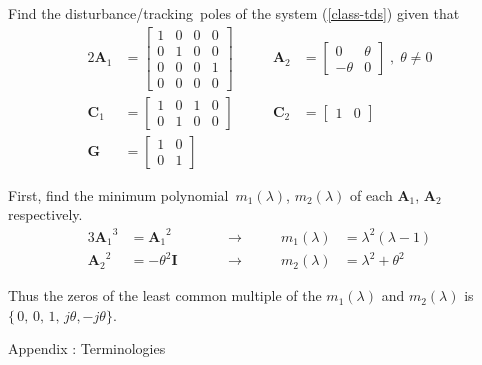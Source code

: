 \documentclass[a4paper,11pt]{article} %
\theoremstyle{plain} %
{\theorembodyfont{\normalfont}
\newtheorem{Exa}{Example}}
\def\mp{minimum polynomial}
\def\dt{disturbance/tracking}
\newcommand{\matr}[1]{\mathbf{#1}}
\begin{document}
\begin{Exa} Find the \dt\ poles of the system (\ref{class-tds}) given that
\begin{alignat}{2}
\matr{A}_1 &= \left[ \begin{array}{cccc}
         1 & 0 & 0 & 0 \\
         0 & 1 & 0 & 0 \\
         0 & 0 & 0 & 1 \\
         0 & 0 & 0 & 0
      \end{array} \right]      &\qquad %
\matr{A}_2 &= \left[ \begin{array}{rr}
         0 & \theta \\
         -\theta & 0
      \end{array} \right] \; , \; \theta \neq 0      \nonumber \\%
\matr{C}_1 &= \left[ \begin{array}{cccc}
         1 & 0 & 1 & 0 \\
         0 & 1 & 0 & 0
       \end{array} \right]   &\qquad
\matr{C}_2 &= \left[ \begin{array}{cc}
                1 & 0
       \end{array} \right]     \nonumber \\%
\matr{G} &= \left[ \begin{array}{cc}
          1 & 0 \\
          0 & 1
     \end{array} \right] \nonumber
\end{alignat}

First, find the \mp\ $m_1(\lambda)$, $m_2(\lambda)$ of each $\matr{A}_1$, $\matr{A}_2$ respectively.
\begin{alignat}{3}
{\matr{A}_1}^3 &= {\matr{A}_1}^2 &\qquad  &\rightarrow &\qquad m_1(\lambda) &= {\lambda}^2 (\lambda - 1) \nonumber \\%
{\matr{A}_2}^2 &= -{\theta}^2 \matr{I} &\qquad &\rightarrow  &\qquad
m_2(\lambda) &= {\lambda}^2+{\theta}^2 \nonumber
\end{alignat}

Thus the zeros of the least common multiple of the $m_1(\lambda)$
and $m_2(\lambda)$ is $\{\,0,\,0,\,1,\,j \theta, -j \theta \}$.

\end{Exa}

\vspace{\baselineskip}
\begin{center}
\sc \Large Appendix : Terminologies
\end{center}
\end{document}
